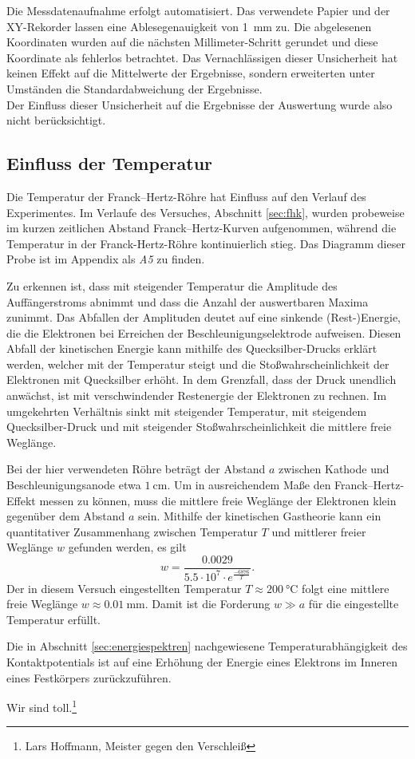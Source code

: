 Die Messdatenaufnahme erfolgt automatisiert.
Das verwendete Papier und der XY-Rekorder lassen eine Ablesegenauigkeit von \SI{1}{\milli\meter} zu.
Die abgelesenen Koordinaten wurden auf die nächsten Millimeter-Schritt gerundet und diese Koordinate als fehlerlos betrachtet.
Das Vernachlässigen dieser Unsicherheit hat keinen Effekt auf die Mittelwerte der Ergebnisse, sondern erweiterten unter Umständen die Standardabweichung der Ergebnisse.\\
Der Einfluss dieser Unsicherheit auf die Ergebnisse der Auswertung wurde also nicht berücksichtigt.

\subsection{Einfluss der Temperatur}
\label{sec:disk_temp}
Die Temperatur der Franck--Hertz-Röhre hat Einfluss auf den Verlauf des Experimentes.
Im Verlaufe des Versuches, Abschnitt \ref{sec:fhk}, wurden probeweise im kurzen zeitlichen Abstand Franck--Hertz-Kurven aufgenommen, während die Temperatur in der Franck-Hertz-Röhre kontinuierlich stieg.
Das Diagramm dieser Probe ist im Appendix als \emph{A5} zu finden.

Zu erkennen ist, dass mit steigender Temperatur die Amplitude des Auffängerstroms %
abnimmt und dass die Anzahl der auswertbaren Maxima zunimmt.
Das Abfallen der Amplituden deutet auf eine sinkende (Rest-)Energie, die die Elektronen bei Erreichen der Beschleunigungselektrode aufweisen.
Diesen Abfall der kinetischen Energie kann mithilfe des Quecksilber-Drucks erklärt werden, welcher mit der Temperatur steigt und die Stoßwahrscheinlichkeit der Elektronen mit Quecksilber erhöht.
In dem Grenzfall, dass der Druck unendlich anwächst, ist mit verschwindender Restenergie der Elektronen zu rechnen.
Im umgekehrten Verhältnis sinkt mit steigender Temperatur, mit steigendem Quecksilber-Druck und mit steigender Stoßwahrscheinlichkeit die mittlere freie Weglänge.

Bei der hier verwendeten Röhre beträgt der Abstand $a$ zwischen Kathode und Beschleunigungsanode etwa $\SI{1}{\centi\meter}$\cite{skript}.
Um in ausreichendem Maße den Franck--Hertz-Effekt messen zu können, muss die mittlere freie Weglänge der Elektronen klein gegenüber dem Abstand $a$
sein.
Mithilfe der kinetischen Gastheorie kann ein quantitativer Zusammenhang zwischen Temperatur $T$ und mittlerer freier Weglänge $w$ gefunden werden, es gilt
\begin{equation}
	w=\frac{0.0029}{5.5\cdot10^7\cdot e^{\frac{-6876}{T}}}.
\end{equation}
Der in diesem Versuch eingestellten Temperatur $T\approx\SI{200}{\degreeCelsius}$ folgt eine mittlere freie Weglänge $w\approx\SI{0.01}{\milli\meter}$. Damit ist die Forderung $w\gg a$ für die eingestellte Temperatur erfüllt.

Die in Abschnitt \ref{sec:energiespektren} nachgewiesene Temperaturabhängigkeit des Kontaktpotentials ist auf eine Erhöhung der Energie 
eines Elektrons im Inneren eines Festkörpers zurückzuführen.

Wir sind toll.\footnote{Lars Hoffmann, Meister gegen den Verschleiß}